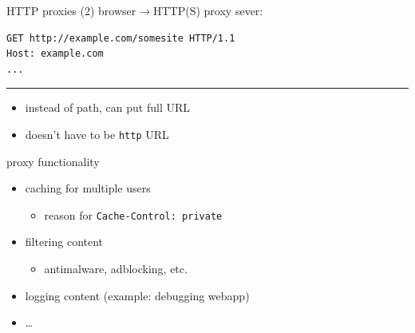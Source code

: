 \begin{frame}[fragile]{HTTP proxies (2)}
browser$\rightarrow$HTTP(S) proxy sever: \\
\begin{Verbatim}
GET http://example.com/somesite HTTP/1.1
Host: example.com
...
\end{Verbatim}
\rule{.9\textwidth}{1mm}
\begin{itemize}
    \item instead of path, can put full URL
    \item doesn't have to be \texttt{http} URL
\end{itemize}
\end{frame}

\begin{frame}{proxy functionality}
    \begin{itemize}
    \item caching for multiple users
        \begin{itemize}
        \item reason for \texttt{Cache-Control: private}
        \end{itemize}
    \item filtering content
        \begin{itemize}
        \item antimalware, adblocking, etc.
        \end{itemize}
    \item logging content (example: debugging webapp)
    \item \ldots
    \end{itemize}
\end{frame}


